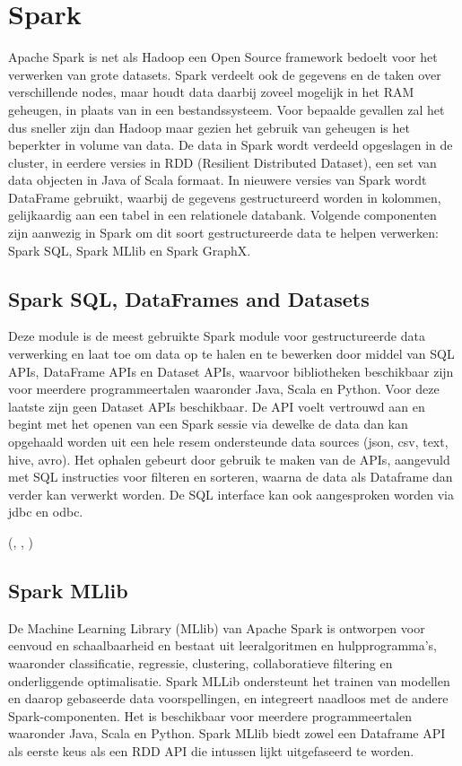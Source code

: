 \section{Spark}
Apache Spark is net als Hadoop een Open Source framework bedoelt voor het verwerken van grote datasets. Spark verdeelt ook de gegevens en de taken over verschillende nodes, maar houdt data daarbij zoveel mogelijk in het RAM geheugen, in plaats van in een bestandssysteem. Voor bepaalde gevallen zal het dus sneller zijn dan Hadoop maar gezien het gebruik van geheugen is het beperkter in volume van data.
\newline
\autocite{AwsAmazon2023a}
\newline
De data in Spark wordt verdeeld opgeslagen in de cluster, in eerdere versies in RDD (Resilient Distributed Dataset), een set van data objecten in Java of Scala formaat. In nieuwere versies van Spark wordt DataFrame gebruikt, waarbij de gegevens gestructureerd worden in kolommen, gelijkaardig aan een tabel in een relationele databank. Volgende componenten zijn aanwezig in Spark om dit soort gestructureerde data te helpen verwerken: Spark SQL, Spark MLlib en Spark GraphX.
\autocite{DataFlair2023}
\newline
\newline


\subsection{Spark SQL, DataFrames and Datasets}
Deze module is de meest gebruikte Spark module voor gestructureerde data verwerking en laat toe om data op te halen en te bewerken door middel van SQL APIs, DataFrame APIs en Dataset APIs, waarvoor bibliotheken beschikbaar zijn voor meerdere programmeertalen waaronder Java, Scala en Python. Voor deze laatste zijn geen Dataset APIs beschikbaar.
De API voelt vertrouwd aan en begint met het openen van een Spark sessie via dewelke de data dan kan opgehaald worden uit een hele resem ondersteunde data sources (json, csv, text, hive, avro). Het ophalen gebeurt door gebruik te maken van de APIs, aangevuld met SQL instructies voor filteren en sorteren, waarna de data als Dataframe dan verder kan verwerkt worden.
De SQL interface kan ook aangesproken worden via jdbc en odbc.

(\autocite{Spark2023}, \autocite{Naveen2023}, \autocite{Spark2023a})


\subsection{Spark MLlib}
De Machine Learning Library (MLlib) van Apache Spark is ontworpen voor eenvoud en schaalbaarheid  en bestaat uit leeralgoritmen en hulpprogramma's, waaronder classificatie, regressie, clustering, collaboratieve filtering en onderliggende optimalisatie. Spark MLLib ondersteunt het trainen van modellen en daarop gebaseerde data voorspellingen, en integreert naadloos met de andere Spark-componenten. Het is beschikbaar voor meerdere programmeertalen waaronder Java, Scala en Python.
Spark MLlib biedt zowel een Dataframe API als eerste keus als een RDD API die intussen lijkt uitgefaseerd te worden.

